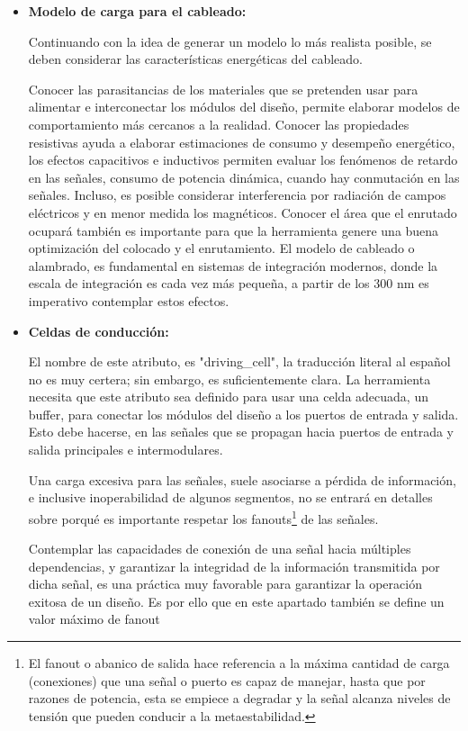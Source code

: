 \begin{itemize}
\item \textbf{Modelo de carga para el cableado:} {Continuando con la idea de generar un modelo lo más realista posible, se deben considerar las características energéticas del cableado.

Conocer las parasitancias de los materiales que se pretenden usar para alimentar e interconectar los módulos del diseño, permite elaborar modelos de comportamiento más cercanos a la realidad. Conocer las propiedades resistivas ayuda a elaborar estimaciones de consumo y desempeño energético, los efectos capacitivos e inductivos permiten evaluar los fenómenos de retardo en las señales, consumo de potencia dinámica, cuando hay conmutación en las señales. Incluso, es posible considerar interferencia por radiación de campos eléctricos y en menor medida los magnéticos. Conocer el área que el enrutado ocupará también es importante para que la herramienta genere una buena optimización del colocado y el enrutamiento. El modelo de cableado o alambrado, es fundamental en sistemas de integración modernos, donde la escala de integración es cada vez más pequeña, a partir de los 300 nm es imperativo contemplar estos efectos.}

\item \textbf{Celdas de conducción:} {El nombre de este atributo, es "driving\_cell", la traducción literal al español no es muy certera; sin embargo, es suficientemente clara. La herramienta necesita que este atributo sea definido para usar una celda adecuada, un buffer, para conectar los módulos del diseño a los puertos de entrada y salida. Esto debe hacerse, en las señales que se propagan hacia puertos de entrada y salida principales e intermodulares.

Una carga excesiva para las señales, suele asociarse a pérdida de información, e inclusive inoperabilidad de algunos segmentos, no se entrará en detalles sobre porqué es importante respetar los fanouts\footnote{El fanout o abanico de salida hace referencia a la máxima cantidad de carga (conexiones) que una señal o puerto es capaz de manejar, hasta que por razones de potencia, esta se empiece a degradar y la señal alcanza niveles de tensión que pueden conducir a la metaestabilidad.} de las señales.

Contemplar las capacidades de conexión de una señal hacia múltiples dependencias, y garantizar la integridad de la información transmitida por dicha señal, es una práctica muy favorable para garantizar la operación exitosa de un diseño. Es por ello que en este apartado también se define un valor máximo de fanout}


\end{itemize}
